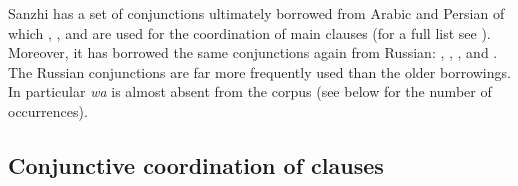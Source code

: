 Sanzhi has a set of conjunctions ultimately borrowed from Arabic and Persian of which  ,  , and   are used for the coordination of main clauses (for a full list see ). Moreover, it has borrowed the same conjunctions again from Russian:  ,  ,  , and  . The Russian conjunctions are far more frequently used than the older borrowings. In particular \textit{wa} is almost absent from the corpus (see below for the number of occurrences).



\subsection{Conjunctive coordination of clauses}
\label{ssec:Conjunctive coordination of clauses}

